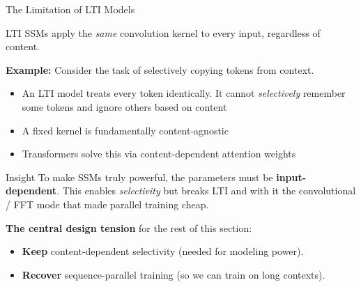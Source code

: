 \begin{frame}{The Limitation of LTI Models}

  LTI SSMs apply the \emph{same} convolution kernel to every input, regardless of content.

  \vspace{0.5em}
  \textbf{Example:} Consider the task of selectively copying tokens from context.

  \begin{center}
  \end{center}

  \begin{itemize}
    \item An LTI model treats every token identically. It cannot \emph{selectively} remember some tokens and ignore others based on content
    \item A fixed kernel is fundamentally \alert{content-agnostic}
    \item Transformers solve this via content-dependent attention weights
  \end{itemize}

  \vspace{0.3em}
  \begin{alertblock}{Insight}
    To make SSMs truly powerful, the parameters must be \textbf{input-dependent}. This enables \emph{selectivity} but \alert{breaks LTI} and with it the convolutional / FFT mode that made parallel training cheap.
  \end{alertblock}

  \textbf{The central design tension} for the rest of this section:
  \begin{itemize}
    \item \textbf{Keep} content-dependent selectivity (needed for modeling power).
    \item \textbf{Recover} sequence-parallel training (so we can train on long contexts).
  \end{itemize}


\end{frame}
